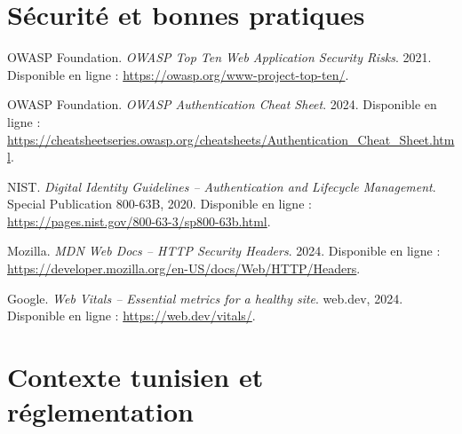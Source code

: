 \section*{Sécurité et bonnes pratiques}

\begin{enumerate}[label={[\arabic*]}, resume]

\item OWASP Foundation. \textit{OWASP Top Ten Web Application Security Risks}. 2021. Disponible en ligne : \url{https://owasp.org/www-project-top-ten/}.

\item OWASP Foundation. \textit{OWASP Authentication Cheat Sheet}. 2024. Disponible en ligne : \url{https://cheatsheetseries.owasp.org/cheatsheets/Authentication_Cheat_Sheet.html}.

\item NIST. \textit{Digital Identity Guidelines -- Authentication and Lifecycle Management}. Special Publication 800-63B, 2020. Disponible en ligne : \url{https://pages.nist.gov/800-63-3/sp800-63b.html}.

\item Mozilla. \textit{MDN Web Docs -- HTTP Security Headers}. 2024. Disponible en ligne : \url{https://developer.mozilla.org/en-US/docs/Web/HTTP/Headers}.

\item Google. \textit{Web Vitals -- Essential metrics for a healthy site}. web.dev, 2024. Disponible en ligne : \url{https://web.dev/vitals/}.

\end{enumerate}

\section*{Contexte tunisien et réglementation}

